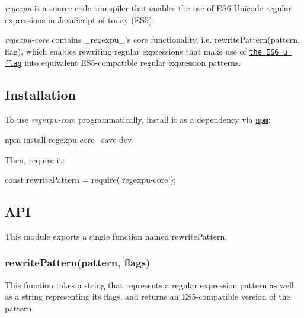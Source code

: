 {\itshape regexpu} is a source code transpiler that enables the use of E\+S6 Unicode regular expressions in Java\+Script-\/of-\/today (E\+S5).

{\itshape regexpu-\/core} contains \+\_\+regexpu\+\_\+’s core functionality, i.\+e. {\ttfamily rewrite\+Pattern(pattern, flag)}, which enables rewriting regular expressions that make use of \href{https://mathiasbynens.be/notes/es6-unicode-regex}{\tt the E\+S6 {\ttfamily u} flag} into equivalent E\+S5-\/compatible regular expression patterns.

\subsection*{Installation}

To use {\itshape regexpu-\/core} programmatically, install it as a dependency via \href{https://www.npmjs.com/}{\tt npm}\+:


\begin{DoxyCode}
npm install regexpu-core --save-dev
\end{DoxyCode}


Then, {\ttfamily require} it\+:


\begin{DoxyCode}
const rewritePattern = require('regexpu-core');
\end{DoxyCode}


\subsection*{A\+PI}

This module exports a single function named {\ttfamily rewrite\+Pattern}.

\subsubsection*{{\ttfamily rewrite\+Pattern(pattern, flags)}}

This function takes a string that represents a regular expression pattern as well as a string representing its flags, and returns an E\+S5-\/compatible version of the pattern.


